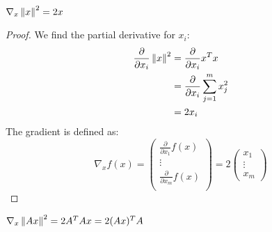 \begin{prop}
$\nabla_x \left\lVert x\right\rVert^2 = 2x$
\end{prop}
\begin{proof}
We find the partial derivative for $x_i$:
\begin{equation}
\begin{split}
\frac{\partial}{\partial x_i} \left\lVert x\right\rVert^2 &= 
	\frac{\partial}{\partial x_i} x^Tx \\
&= \frac{\partial}{\partial x_i} \sum_{j=1}^{m} x_j^2 \\
&= 2x_i
\end{split}
\end{equation}
The gradient is defined as:
\begin{equation}
\nabla_x f(x)= 
\begin{pmatrix}
\frac{\partial}{\partial x_1} f(x)\\
\vdots \\
\frac{\partial}{\partial x_m} f(x)\\
\end{pmatrix}
=2
\begin{pmatrix}
x_1\\
\vdots \\
x_m
\end{pmatrix}
\end{equation}
\end{proof}

\begin{prop}
$\nabla_x \left\lVert Ax\right\rVert^2 = 2A^TAx = 2(Ax)^TA$ 
\end{prop}

